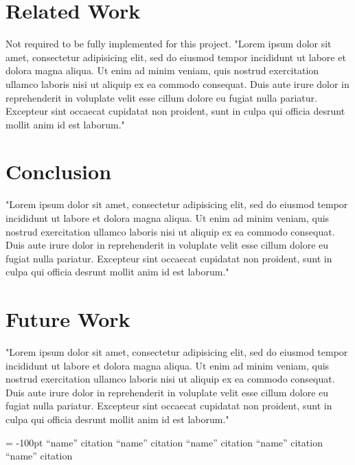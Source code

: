 \documentclass[11pt, twocolumn]{article}
\begin{document}
\section{Related Work} %
Not required to be fully implemented for this project.
"Lorem ipsum dolor sit amet, consectetur adipisicing elit, sed do eiusmod tempor incididunt ut labore et dolora magna aliqua.  Ut enim ad minim veniam, quis nostrud exercitation ullamco laboris nisi ut aliquip ex ea commodo consequat.  Duis aute irure dolor in reprehenderit in voluplate velit esse cillum dolore eu fugiat nulla pariatur.  Excepteur sint occaecat cupidatat non proident, sunt in culpa qui officia desrunt mollit anim id est laborum."

\section{Conclusion} %
"Lorem ipsum dolor sit amet, consectetur adipisicing elit, sed do eiusmod tempor incididunt ut labore et dolora magna aliqua.  Ut enim ad minim veniam, quis nostrud exercitation ullamco laboris nisi ut aliquip ex ea commodo consequat.  Duis aute irure dolor in reprehenderit in voluplate velit esse cillum dolore eu fugiat nulla pariatur.  Excepteur sint occaecat cupidatat non proident, sunt in culpa qui officia desrunt mollit anim id est laborum."

\section{Future Work} %
"Lorem ipsum dolor sit amet, consectetur adipisicing elit, sed do eiusmod tempor incididunt ut labore et dolora magna aliqua.  Ut enim ad minim veniam, quis nostrud exercitation ullamco laboris nisi ut aliquip ex ea commodo consequat.  Duis aute irure dolor in reprehenderit in voluplate velit esse cillum dolore eu fugiat nulla pariatur.  Excepteur sint occaecat cupidatat non proident, sunt in culpa qui officia desrunt mollit anim id est laborum."

\begin{flushleft}
\begin{thebibliography}{99}
\topmargin = -100pt
    ``name''
        citation
    ``name''
        citation
    ``name''
        citation
    ``name''
        citation
    ``name''
        citation
\end{thebibliography}
\end{flushleft}
\end{document}
